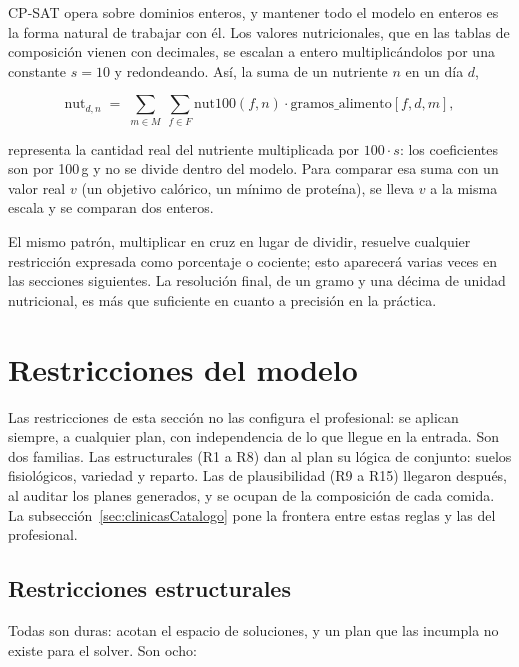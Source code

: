 CP-SAT opera sobre dominios enteros, y mantener todo el modelo en enteros es la forma natural de trabajar con él. Los valores nutricionales, que en las tablas de composición vienen con decimales, se escalan a entero multiplicándolos por una constante $s = 10$ y redondeando. Así, la suma de un nutriente $n$ en un día $d$,

\begin{equation*}
\text{nut}_{d,n} \;=\; \sum_{m \in M}\ \sum_{f \in F} \text{nut100}(f, n) \cdot \text{gramos\_alimento}[f,d,m],
\end{equation*}

representa la cantidad real del nutriente multiplicada por $100 \cdot s$: los coeficientes son por 100\,g y no se divide dentro del modelo. Para comparar esa suma con un valor real $v$ (un objetivo calórico, un mínimo de proteína), se lleva $v$ a la misma escala y se comparan dos enteros.

El mismo patrón, multiplicar en cruz en lugar de dividir, resuelve cualquier restricción expresada como porcentaje o cociente; esto aparecerá varias veces en las secciones siguientes. La resolución final, de un gramo y una décima de unidad nutricional, es más que suficiente en cuanto a precisión en la práctica.

\section{Restricciones del modelo}
\label{sec:reglasModelo}

Las restricciones de esta sección no las configura el profesional: se aplican siempre, a cualquier plan, con independencia de lo que llegue en la entrada. Son dos familias. Las estructurales (R1 a R8) dan al plan su lógica de conjunto: suelos fisiológicos, variedad y reparto. Las de plausibilidad (R9 a R15) llegaron después, al auditar los planes generados, y se ocupan de la composición de cada comida. La subsección~\ref{sec:clinicasCatalogo} pone la frontera entre estas reglas y las del profesional.

\subsection{Restricciones estructurales}
\label{sec:estructurales}

Todas son duras: acotan el espacio de soluciones, y un plan que las incumpla no existe para el solver. Son ocho:

